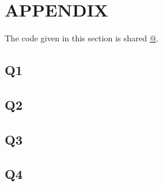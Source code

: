 \documentclass[11pt]{extarticle}
\begin{document}
\pagebreak
\section{APPENDIX}
The code given in this section is shared \href{https://github.com/kutay-ugurlu/Pattern-Recognition/tree/master/HW4}{@\faGithubSquare}.
\subsection{Q1}\label{subsec:Q1_code}

\pagebreak
\subsection{Q2} \label{subsec:Q2_code}

\pagebreak
\subsection{Q3}\label{subsec:Q3_code}

\pagebreak
\subsection{Q4}\label{subsec:Q4_code}

\end{document}
